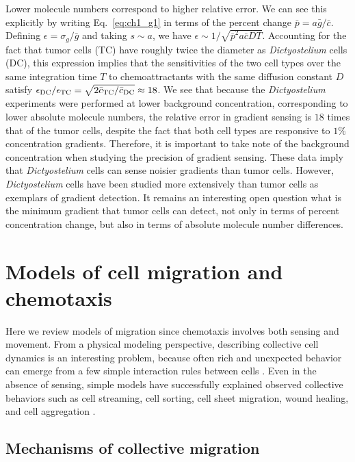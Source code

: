 Lower molecule numbers correspond to higher relative error. We can see this explicitly by writing Eq.\ \ref{eq:ch1_g1} in terms of the percent change $\bar{p} = a\bar{g}/\bar{c}$. Defining $\epsilon = \sigma_g/\bar{g}$ and taking $s \sim a$, we have
$\epsilon \sim 1/\sqrt{\bar{p}^2a\bar{c}DT}$.
Accounting for the fact that tumor cells (TC) have roughly twice the diameter as \textit{Dictyostelium} cells (DC), this expression implies that the sensitivities of the two cell types over the same integration time $T$ to chemoattractants with the same diffusion constant $D$ satisfy
$\epsilon_{\rm DC}/\epsilon_{\rm TC} = \sqrt{2\bar{c}_{\rm TC}/\bar{c}_{\rm DC}} \approx 18$.
We see that because the \textit{Dictyostelium} experiments were performed at lower background concentration, corresponding to lower absolute molecule numbers, the relative error in gradient sensing is $18$ times that of the tumor cells, despite the fact that both cell types are responsive to $1\%$ concentration gradients. Therefore, it is important to take note of the background concentration when studying the precision of gradient sensing. These data imply that \textit{Dictyostelium} cells can sense noisier gradients than tumor cells. However, \textit{Dictyostelium} cells have been studied more extensively than tumor cells as exemplars of gradient detection. It remains an interesting open question what is the minimum gradient that tumor cells can detect, not only in terms of percent concentration change, but also in terms of absolute molecule number differences.


\section{Models of cell migration and chemotaxis}

Here we review models of migration since chemotaxis involves both sensing and movement. From a physical modeling perspective, describing collective cell dynamics is an interesting problem, because often rich and unexpected behavior can emerge from a few simple interaction rules between cells \cite{vicsek1995novel,coburn2013tactile}.
Even in the absence of sensing, simple models have successfully explained observed collective behaviors such as cell streaming, cell sorting, cell sheet migration, wound healing, and cell aggregation \cite{kabla2012collective,szabo2010collective,basan2013alignment,janulevicius2015short}.


\subsection{Mechanisms of collective migration}


